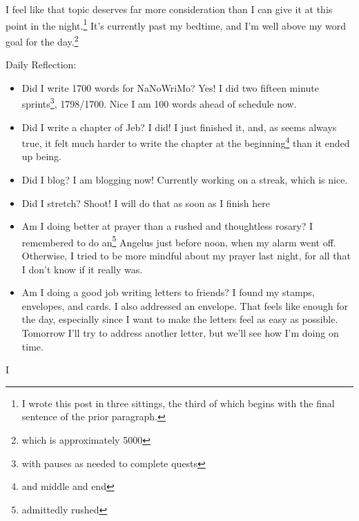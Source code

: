 \documentclass[12pt]{article}[titlepage]
\newcommand{\1}{\={a}}
\newcommand{\2}{\={e}}
\newcommand{\3}{\={\i}}
\newcommand{\4}{\=o}
\newcommand{\5}{\=u}
\newcommand{\6}{\={A}}
\renewcommand{\,}{\textsuperscript{,}}
\begin{document}
I feel like that topic deserves far more consideration than I can give it at this point in the night.\footnote{I wrote this post in three sittings, the third of which begins with the final sentence of the prior paragraph.}
It's currently past my bedtime, and I'm well above my word goal for the day.\footnote{which is approximately 5000}

Daily Reflection:
\begin{itemize}
\item Did I write 1700 words for NaNoWriMo? Yes! I did two fifteen minute sprints\footnote{with pauses as needed to complete quests}, 1798/1700. Nice I am 100 words ahead of schedule now.
\item Did I write a chapter of Jeb? I did! I just finished it, and, as seems always true, it felt much harder to write the chapter at the beginning\footnote{and middle and end} than it ended up being.
\item Did I blog? I am blogging now! Currently working on a streak, which is nice.
\item Did I stretch? Shoot! I will do that as soon as I finish here
\item Am I doing better at prayer than a rushed and thoughtless rosary? I remembered to do an\footnote{admittedly rushed} Angelus just before noon, when my alarm went off. 
Otherwise, I tried to be more mindful about my prayer last night, for all that I don't know if it really was.
\item Am I doing a good job writing letters to friends?
I found my stamps, envelopes, and cards.
I also addressed an envelope.
That feels like enough for the day, especially since I want to make the letters feel as easy as possible.
Tomorrow I'll try to address another letter, but we'll see how I'm doing on time.
\end{itemize}

I
\end{document}
